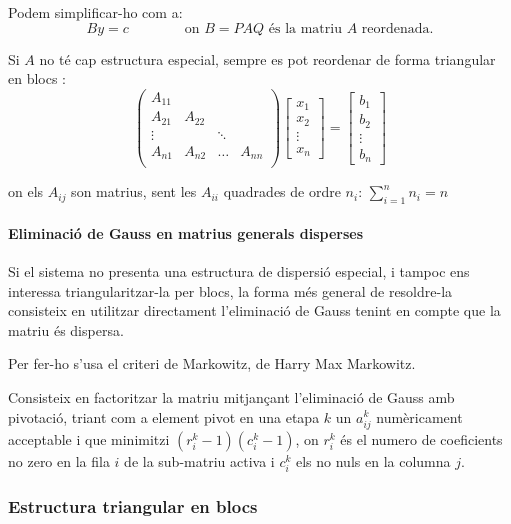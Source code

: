 \documentclass[11pt,a4paper,twoside]{report}
\begin{document}
Podem simplificar-ho com a:
\[By = c \qquad \qquad \text{on $B = PAQ$ és la matriu $A$ reordenada.} \]

Si $A$ no té cap estructura especial, sempre es pot reordenar de forma triangular en blocs : 
\[
\begin{pmatrix}
A_{11}	\\
A_{21}	&	A_{22}	\\
\vdots		&	& \ddots	&	\\
A_{n1}	&	A_{n2}	&	\dots	&	A_{nn}	\\
\end{pmatrix}
\begin{bmatrix}
x_1 \\ x_2 \\ \vdots \\ x_n
\end{bmatrix}
=
\begin{bmatrix}
b_1 \\ b_2 \\ \vdots \\ b_n
\end{bmatrix}
\]

on els $A_{ij}$ son matrius, sent les $A_{ii}$ quadrades de ordre $n_i$: $\sum_{i = 1}^n n_i = n$

\paragraph*{Eliminació de Gauss en matrius generals disperses} \mbox{}

Si el sistema no presenta una estructura de dispersió especial, i tampoc ens interessa triangularitzar-la per blocs, la forma més general de resoldre-la consisteix en utilitzar directament l'eliminació de Gauss tenint en compte que la matriu és dispersa.

Per fer-ho s'usa el criteri de Markowitz, de Harry Max Markowitz.

Consisteix en factoritzar la matriu mitjançant l'eliminació de Gauss amb pivotació, triant com a element pivot en una etapa $k$ un $a_{ij}^k$ numèricament acceptable i que minimitzi $(r_i^k - 1)(c_i^k - 1)$, on $r_i^k$ és el numero de coeficients no zero en la fila $i$ de la sub-matriu activa i $c_i^k$ els no nuls en la columna $j$.

\subsubsection{Estructura triangular en blocs}
\end{document}
